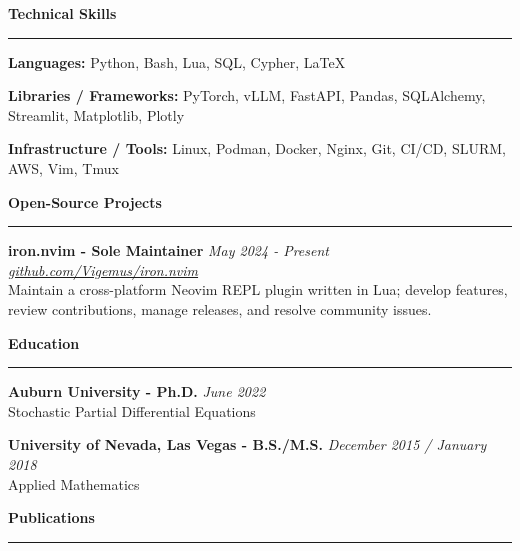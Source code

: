 \documentclass[11pt]{article}
\begin{document}
\textbf{\Large Technical Skills} \vspace{.2em} \hrule

\textbf{Languages:}
Python, Bash, Lua, SQL, Cypher, \LaTeX

\vspace{-.5em}

\textbf{Libraries / Frameworks:}
PyTorch, vLLM, FastAPI, Pandas, SQLAlchemy, Streamlit, Matplotlib, Plotly

\vspace{-.5em}

\textbf{Infrastructure / Tools:}
Linux, Podman, Docker, Nginx, Git, CI/CD, SLURM, AWS, Vim, Tmux


\textbf{\Large Open-Source Projects} \vspace{.2em} \hrule

\textbf{\large iron.nvim - Sole Maintainer}
\hfill \textit{May 2024 - Present}\\
\href{https://github.com/Vigemus/iron.nvim}
     {\textit{github.com/Vigemus/iron.nvim}}\\
Maintain a cross-platform Neovim REPL plugin written in Lua; develop features,
review contributions, manage releases, and resolve community issues.


\textbf{\Large Education} \vspace{.2em} \hrule

\textbf{Auburn University - Ph.D.}
\hfill \textit{June 2022}\\
Stochastic Partial Differential Equations

\textbf{University of Nevada, Las Vegas - B.S./M.S.}
\hfill \textit{December 2015 / January 2018}\\
Applied Mathematics


\textbf{\Large Publications} \vspace{.2em} \hrule
\end{document}
